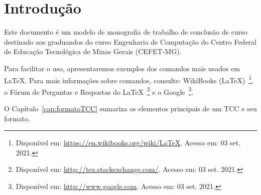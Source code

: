 \chapter[Introdução]{Introdução}
\label{cap:introducao}

Este documento é um modelo de monografia de trabalho de conclusão de curso destinado aos graduandos do curso Engenharia de Computação do Centro Federal de Educação Tecnológica de Minas Gerais (CEFET-MG).

Para facilitar o uso, apresentaremos exemplos dos comandos mais usados em \LaTeX. Para mais informações sobre comandos, consulte: WikiBooks (\LaTeX)~\footnote{Disponível em: \url{https://en.wikibooks.org/wiki/LaTeX}. Acesso em: 03 set. 2021.}, o Fórum de Perguntas e Respostas do \LaTeX~\footnote{Disponível em: \url{http://tex.stackexchange.com/}. Acesso em: 03 set. 2021.} e o Google~\footnote{Disponível em: \url{http://www.google.com}. Acesso em: 03 set. 2021.}. 

O Capítulo~\ref{cap:formatoTCC} sumariza os elementos principais de um TCC e seu formato.